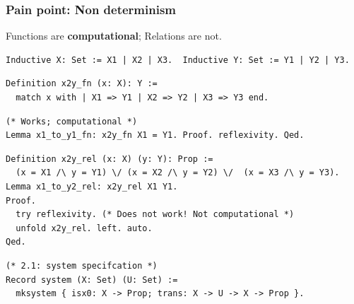 \documentclass{beamer}
\begin{document}
\begin{frame}[fragile]
\frametitle{Pain point: Non determinism}
Functions are \textbf{computational}; Relations are not.
\pause
{\footnotesize
\begin{verbatim}
Inductive X: Set := X1 | X2 | X3.  Inductive Y: Set := Y1 | Y2 | Y3. 
\end{verbatim}
\pause
\begin{verbatim}
Definition x2y_fn (x: X): Y :=
  match x with | X1 => Y1 | X2 => Y2 | X3 => Y3 end.
\end{verbatim}
\pause
\begin{verbatim}
(* Works; computational *)
Lemma x1_to_y1_fn: x2y_fn X1 = Y1. Proof. reflexivity. Qed.
\end{verbatim}
\pause



\begin{verbatim}
Definition x2y_rel (x: X) (y: Y): Prop :=
  (x = X1 /\ y = Y1) \/ (x = X2 /\ y = Y2) \/  (x = X3 /\ y = Y3).
Lemma x1_to_y2_rel: x2y_rel X1 Y1.
Proof.
  try reflexivity. (* Does not work! Not computational *)
  unfold x2y_rel. left. auto.
Qed.
\end{verbatim}
\pause
\begin{verbatim}
(* 2.1: system specifcation *)
Record system (X: Set) (U: Set) := 
  mksystem { isx0: X -> Prop; trans: X -> U -> X -> Prop }.
\end{verbatim}
}
\end{frame}
\end{document}
